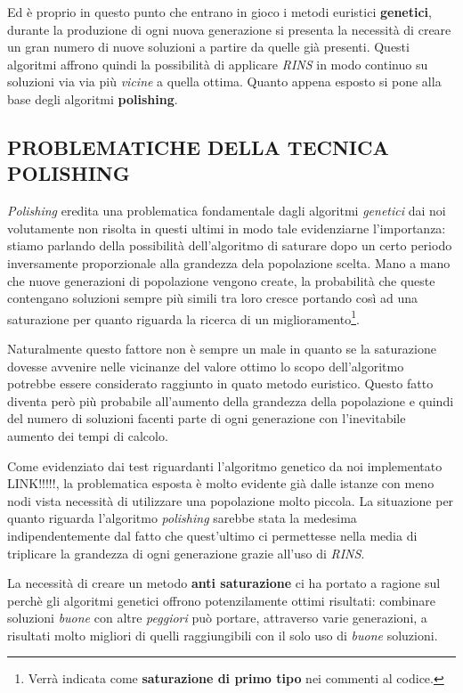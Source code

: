\documentclass[11pt]{article}
\begin{document}
Ed è proprio in questo punto che entrano in gioco i metodi euristici \textbf{genetici}, durante la produzione di ogni nuova generazione si presenta la necessità di creare un gran numero di nuove soluzioni a partire da quelle già presenti. Questi algoritmi affrono quindi la possibilità di applicare \textit{RINS} in modo continuo su soluzioni via via più \textit{vicine} a quella ottima. Quanto appena esposto si pone alla base degli algoritmi \textbf{polishing}.

\subsection*{PROBLEMATICHE DELLA TECNICA POLISHING}
\label{sec:ProblematichePolishingS}

\textit{Polishing} eredita una problematica fondamentale dagli algoritmi \textit{genetici} dai noi volutamente non risolta in questi ultimi in modo tale evidenziarne l'importanza: stiamo parlando della possibilità dell'algoritmo di saturare dopo un certo periodo inversamente proporzionale alla grandezza dela popolazione scelta. Mano a mano che nuove generazioni di popolazione vengono create, la probabilità che queste contengano soluzioni sempre più simili tra loro cresce portando così ad una saturazione per quanto riguarda la ricerca di un miglioramento\footnote{Verrà indicata come \textbf{saturazione di primo tipo} nei commenti al codice.}.

Naturalmente questo fattore non è sempre un male in quanto se la saturazione dovesse avvenire nelle vicinanze del valore ottimo lo scopo dell'algoritmo potrebbe essere considerato raggiunto in quato metodo euristico. Questo fatto diventa però più probabile all'aumento della grandezza della popolazione e quindi del numero di soluzioni facenti parte di ogni generazione con l'inevitabile aumento dei tempi di calcolo.

Come evidenziato dai test riguardanti l'algoritmo genetico da noi implementato LINK!!!!!, la problematica esposta è molto evidente già dalle istanze con meno nodi vista necessità di utilizzare una popolazione molto piccola. La situazione per quanto riguarda l'algoritmo \textit{polishing} sarebbe stata la medesima indipendentemente dal fatto che quest'ultimo ci permettesse nella media di triplicare la grandezza di ogni generazione grazie all'uso di \textit{RINS}.

La necessità di creare un metodo \textbf{anti saturazione} ci ha portato a ragione sul perchè gli algoritmi genetici offrono potenzilamente ottimi risultati: combinare soluzioni \textit{buone} con altre \textit{peggiori} può portare, attraverso varie generazioni, a risultati molto migliori di quelli raggiungibili con il solo uso di \textit{buone} soluzioni.
\end{document}
